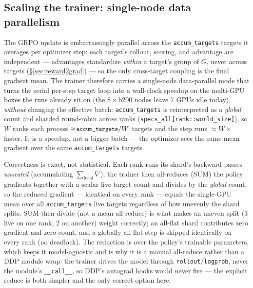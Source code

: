 \documentclass[11pt]{article}
\newcommand{\ttk}[1]{\texttt{\small #1}}
\begin{document}
\subsection{Scaling the trainer: single-node data parallelism}
\label{sec:multigpu}
The GRPO update is embarrassingly parallel across the \ttk{accum\_targets} targets it averages per
optimizer step: each target's rollout, scoring, and advantage are independent --- advantages
standardize \emph{within} a target's group of $G$, never across targets (\S\ref{sec:reward2grad}) ---
so the only cross-target coupling is the final gradient mean. The trainer therefore carries a
single-node data-parallel mode that turns the serial per-step target loop into a wall-clock speedup on
the multi-GPU boxes the runs already sit on (the $8\times$b200 nodes leave $7$ GPUs idle today),
\emph{without} changing the effective batch: \ttk{accum\_targets} is reinterpreted as a \emph{global}
count and sharded round-robin across ranks (\ttk{specs\_all[rank::world\_size]}), so $W$ ranks each
process $\approx\!\ttk{accum\_targets}/W$ targets and the step runs $\approx\!W\times$ faster. It is a
speedup, not a bigger batch --- the optimizer sees the same mean gradient over the same
\ttk{accum\_targets} targets.

Correctness is exact, not statistical. Each rank runs its shard's backward passes \emph{unscaled}
(accumulating $\sum_{\text{local}}\nabla$); the trainer then all-reduces (SUM) the policy gradients
together with a scalar live-target count and divides by the \emph{global} count, so the reduced
gradient --- identical on every rank --- equals the single-GPU mean over all \ttk{accum\_targets} live
targets regardless of how unevenly the shard splits. SUM-then-divide (not a mean all-reduce) is what
makes an uneven split ($3$ live on one rank, $2$ on another) weight correctly; an all-flat shard
contributes zero gradient and zero count, and a globally all-flat step is skipped identically on every
rank (no deadlock). The reduction is over the policy's trainable parameters, which keeps it
model-agnostic and is why it is a manual all-reduce rather than a DDP module wrap: the trainer drives
the model through \ttk{rollout}/\ttk{logprob}, never the module's \ttk{\_\_call\_\_}, so DDP's autograd
hooks would never fire --- the explicit reduce is both simpler and the only correct option here.
\end{document}

